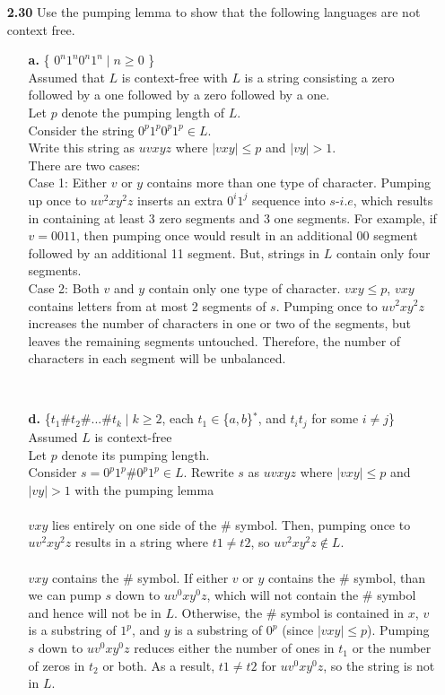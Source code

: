 \documentclass[12pt]{letter}
\begin{document}
\begin{enumerate}
\ \\ %
\item[\textbf{2.30}] Use the pumping lemma to show that the following languages are not context free.\\
\begin{enumerate}
	\item[\textbf{a.}] \{ $0^n1^n0^n1^n \mid n \geq 0$ \}
	\leavevmode \\
Assumed that $L$ is context-free with $L$ is a string consisting a zero followed by a one followed by a zero followed by a one. \\
Let $p$ denote the pumping length of $L$. \\
Consider the string $0^p1^p0^p1^p \in L$. \\
Write this string as $uvxyz$ where $|vxy| \leq p$ and $|vy| > 1$. \\
There are two cases: \\
	Case 1: Either $v$ or $y$ contains more than one type of character. Pumping up once to $uv^2xy^2z$ inserts an extra $0^i1^j$ sequence into $s$-$i.e$, which results in containing at least 3 zero segments and 3 one segments. For example, if $v = 0011$, then pumping once would result in an additional 00 segment followed by an additional 11 segment. But, strings in $L$ contain only four segments. \\
	Case 2: Both $v$ and $y$ contain only one type of character. $vxy \leq p$, $vxy$ contains letters from at most 2 segments of $s$. Pumping once to $uv^2xy^2z$ increases the number of characters in one or two of the segments, but leaves the remaining segments untouched. Therefore, the number of characters in each segment will be unbalanced.

	\leavevmode \\
	\item[\textbf{d.}] \{$t_1\#t_2\#...\#t_k \mid k \geq 2$, each $t_1 \in $\{$a,b$\}$^*$, and $t_it_j$ for some $i \neq j$\}
	\leavevmode \\
	Assumed $L$ is context-free \\
	Let $p$ denote its pumping length. \\
	Consider $s = 0^p1^p\#0^p1^p \in L$. Rewrite $s$ as $uvxyz$ where $|vxy| \leq p$ and $|vy| > 1$ with the pumping lemma \\
	\leavevmode \\
	$vxy$ lies entirely on one side of the \# symbol. Then, pumping once to $uv^2xy^2z$ results in a string where $t1 \neq t2$, so $uv^2xy^2z \notin L$. \\
	\leavevmode \\
	$vxy$ contains the \# symbol. If either $v$ or $y$ contains the \# symbol, than we can pump $s$ down to $uv^0xy^0z$, which will not contain the \# symbol and hence will not be in $L$. Otherwise, the \# symbol is contained in $x$, $v$ is a substring of $1^p$, and $y$ is a substring of $0^p$ (since $|vxy| \leq p$). Pumping $s$ down to $uv^0xy^0z$ reduces either the number of ones in $t_1$ or the number of zeros in $t_2$ or both. As a result, $t1 \neq t2$ for $uv^0xy^0z$, so the string is not in $L$.
 \end{enumerate}


\end{enumerate}
\end{document}
